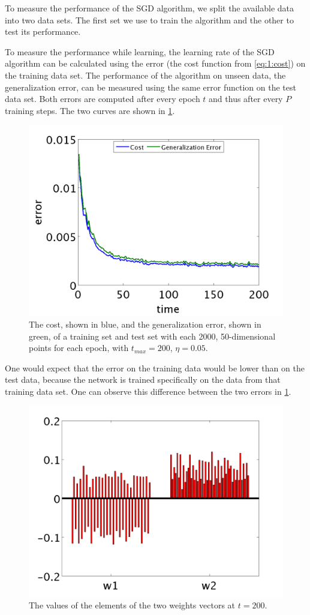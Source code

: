 To measure the performance of the SGD algorithm, we split the available data into two data sets. The first set we use to train the algorithm and the other to test its performance. 

To measure the performance while learning, the learning rate of the SGD algorithm can be calculated using the error (the cost function from \eqref{eq:1:cost}) on the training data set. The performance of the algorithm on unseen data, the generalization error, can be measured using the same error function on the test data set. Both errors are computed after every epoch $t$ and thus after every $P$ training steps. The two curves are shown in \cref{fig:exp:errors}.

\begin{figure}
	\centering
	\includegraphics[width=\columnwidth]{./img/errors_train_2000_test_2000.png}
	\caption{The cost, shown in blue, and the generalization error, shown in green, of a training set and test set with each 2000, 50-dimensional points for each epoch, with $t_{max} = 200$, $\eta = 0.05$.}
	\label{fig:exp:errors}
\end{figure}

One would expect that the error on the training data would be lower than on the test data, because the network is trained specifically on the data from that training data set. One can observe this difference between the two errors in \cref{fig:exp:errors}.

\begin{figure}
	\centering
	\includegraphics[width=\columnwidth]{./img/weights_train_2000_test_2000.png}
	\caption{The values of the elements of the two weights vectors at $t = 200$.}
	\label{fig:exp:weights}
\end{figure}